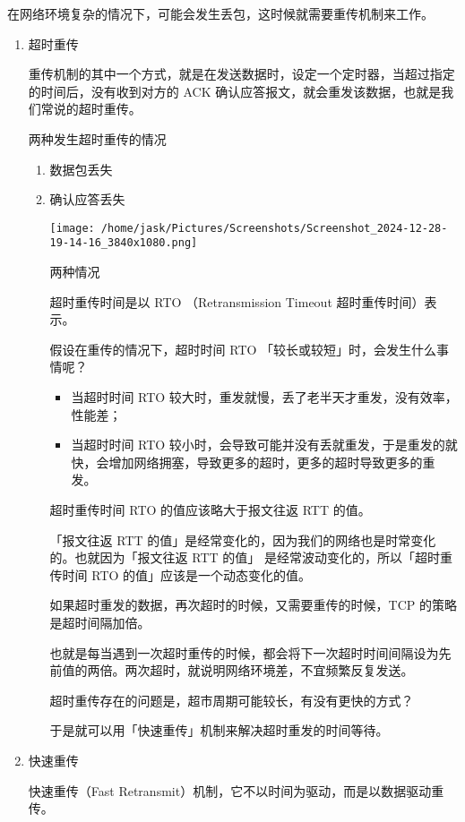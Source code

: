 \documentclass[11pt]{article}
\begin{document}
在网络环境复杂的情况下，可能会发生丢包，这时候就需要重传机制来工作。
\begin{enumerate}
\item 超时重传
\label{sec:org2c1eb9c}

重传机制的其中一个方式，就是在发送数据时，设定一个定时器，当超过指定的时间后，没有收到对方的 ACK 确认应答报文，就会重发该数据，也就是我们常说的超时重传。

两种发生超时重传的情况

\begin{enumerate}
\item 数据包丢失
\item 确认应答丢失
\begin{center}
\texttt{[image: /home/jask/Pictures/Screenshots/Screenshot\_2024-12-28-19-14-16\_3840x1080.png]}
\end{center}
两种情况

超时重传时间是以 RTO （Retransmission Timeout 超时重传时间）表示。

假设在重传的情况下，超时时间 RTO 「较长或较短」时，会发生什么事情呢？
\begin{itemize}
\item 当超时时间 RTO 较大时，重发就慢，丢了老半天才重发，没有效率，性能差；

\item 当超时时间 RTO 较小时，会导致可能并没有丢就重发，于是重发的就快，会增加网络拥塞，导致更多的超时，更多的超时导致更多的重发。
\end{itemize}

超时重传时间 RTO 的值应该略大于报文往返 RTT 的值。

「报文往返 RTT 的值」是经常变化的，因为我们的网络也是时常变化的。也就因为「报文往返 RTT 的值」 是经常波动变化的，所以「超时重传时间 RTO 的值」应该是一个动态变化的值。

如果超时重发的数据，再次超时的时候，又需要重传的时候，TCP 的策略是超时间隔加倍。

也就是每当遇到一次超时重传的时候，都会将下一次超时时间间隔设为先前值的两倍。两次超时，就说明网络环境差，不宜频繁反复发送。

超时重传存在的问题是，超市周期可能较长，有没有更快的方式？

于是就可以用「快速重传」机制来解决超时重发的时间等待。
\end{enumerate}
\item 快速重传
\label{sec:org8a43218}

快速重传（Fast Retransmit）机制，它不以时间为驱动，而是以数据驱动重传。


\end{enumerate}
\end{document}
